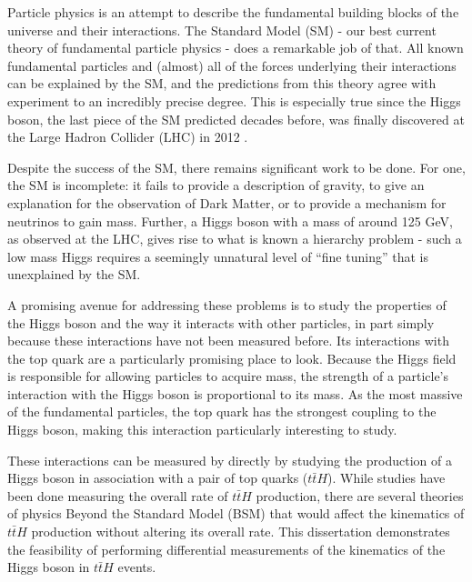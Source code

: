 Particle physics is an attempt to describe the fundamental building blocks of the universe and their interactions. The Standard Model (SM) - our best current theory of fundamental particle physics - does a remarkable job of that. All known fundamental particles and (almost) all of the forces underlying their interactions can be explained by the SM, and the predictions from this theory agree with experiment to an incredibly precise degree. This is especially true since the Higgs boson, the last piece of the SM predicted decades before, was finally discovered at the Large Hadron Collider (LHC) in 2012 \cite{HIGG-2012-27}. 

Despite the success of the SM, there remains significant work to be done. For one, the SM is incomplete: it fails to provide a description of gravity, to give an explanation for the observation of Dark Matter, or to provide a mechanism for neutrinos to gain mass. Further, a Higgs boson with a mass of around 125 GeV, as observed at the LHC, gives rise to what is known a hierarchy problem - such a low mass Higgs requires a seemingly unnatural level of ``fine tuning'' that is unexplained by the SM.

A promising avenue for addressing these problems is to study the properties of the Higgs boson and the way it interacts with other particles, in part simply because these interactions have not been measured before. Its interactions with the top quark are a particularly promising place to look. Because the Higgs field is responsible for allowing particles to acquire mass, the strength of a particle's interaction with the Higgs boson is proportional to its mass. As the most massive of the fundamental particles, the top quark has the strongest coupling to the Higgs boson, making this interaction particularly interesting to study.

These interactions can be measured by directly by studying the production of a Higgs boson in association with a pair of top quarks ($t\bar{t}H$). While studies have been done measuring the overall rate of $t\bar{t}H$ production, there are several theories of physics Beyond the Standard Model (BSM) that would affect the kinematics of $t\bar{t}H$ production without altering its overall rate. This dissertation demonstrates the feasibility of performing differential measurements of the kinematics of the Higgs boson in $t\bar{t}H$ events.


